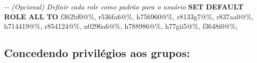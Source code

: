 \documentclass[
]{book}
\newenvironment{Shaded}{\begin{snugshade}}{\end{snugshade}}
\newcommand{\CommentTok}[1]{\textcolor[rgb]{0.56,0.35,0.01}{\textit{#1}}}
\newcommand{\KeywordTok}[1]{\textcolor[rgb]{0.13,0.29,0.53}{\textbf{#1}}}
\newcommand{\NormalTok}[1]{#1}
\newcommand{\StringTok}[1]{\textcolor[rgb]{0.31,0.60,0.02}{#1}}
\begin{document}
\begin{Shaded}
\begin{Highlighting}[]
\CommentTok{{-}{-} (Opcional) Definir cada role como padrão para o usuário}
\KeywordTok{SET} \KeywordTok{DEFAULT} \KeywordTok{ROLE} \KeywordTok{ALL} \KeywordTok{TO}
    \StringTok{\textquotesingle{}f362bf0\textquotesingle{}}\NormalTok{@}\StringTok{\textquotesingle{}\%\textquotesingle{}}\NormalTok{,}
    \StringTok{\textquotesingle{}r536fa6\textquotesingle{}}\NormalTok{@}\StringTok{\textquotesingle{}\%\textquotesingle{}}\NormalTok{,}
    \StringTok{\textquotesingle{}h756960\textquotesingle{}}\NormalTok{@}\StringTok{\textquotesingle{}\%\textquotesingle{}}\NormalTok{,}
    \StringTok{\textquotesingle{}r8133g7\textquotesingle{}}\NormalTok{@}\StringTok{\textquotesingle{}\%\textquotesingle{}}\NormalTok{,}
    \StringTok{\textquotesingle{}r837aa0\textquotesingle{}}\NormalTok{@}\StringTok{\textquotesingle{}\%\textquotesingle{}}\NormalTok{,}
    \StringTok{\textquotesingle{}h714419\textquotesingle{}}\NormalTok{@}\StringTok{\textquotesingle{}\%\textquotesingle{}}\NormalTok{,}
    \StringTok{\textquotesingle{}r854124\textquotesingle{}}\NormalTok{@}\StringTok{\textquotesingle{}\%\textquotesingle{}}\NormalTok{,}
    \StringTok{\textquotesingle{}n0296a6\textquotesingle{}}\NormalTok{@}\StringTok{\textquotesingle{}\%\textquotesingle{}}\NormalTok{,}
    \StringTok{\textquotesingle{}h788986\textquotesingle{}}\NormalTok{@}\StringTok{\textquotesingle{}\%\textquotesingle{}}\NormalTok{,}
    \StringTok{\textquotesingle{}h77gii5\textquotesingle{}}\NormalTok{@}\StringTok{\textquotesingle{}\%\textquotesingle{}}\NormalTok{,}
    \StringTok{\textquotesingle{}f3648i0\textquotesingle{}}\NormalTok{@}\StringTok{\textquotesingle{}\%\textquotesingle{}}\NormalTok{;}
\end{Highlighting}
\end{Shaded}

\subsection{Concedendo privilégios aos grupos:}\label{concedendo-priviluxe9gios-aos-grupos}
\end{document}
